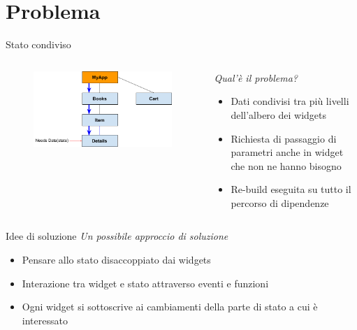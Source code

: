 \documentclass{../libs/presentation_format}
\begin{document}

\section{Problema}
\begin{frame}{Stato condiviso}
	\begin{minipage}[0.2\textheight]{\textwidth}
		\begin{columns}[T]
			\begin{column}{0.4\textwidth}
				\begin{figure}[htpb]
					\centering
					\includegraphics[scale=0.2]{../libs/state-management-problem}
				\end{figure}
			\end{column}
			\begin{column}{0.6\textwidth}
				\emph{Qual'è il problema?}
				\begin{itemize}
					\item Dati condivisi tra più livelli dell'albero dei widgets
					\item Richiesta di passaggio di parametri anche in widget che non ne hanno bisogno
					\item Re-build eseguita su tutto il percorso di dipendenze
				\end{itemize}
			\end{column}
		\end{columns}
	\end{minipage}
\end{frame}


\begin{frame}{Idee di soluzione}
	\emph{Un possibile approccio di soluzione}
	\begin{itemize}
		\item Pensare allo stato disaccoppiato dai widgets
		\item Interazione tra widget e stato attraverso eventi e funzioni
		\item Ogni widget si sottoscrive ai cambiamenti della parte di stato a cui è interessato
	\end{itemize}
\end{frame}
\end{document}

